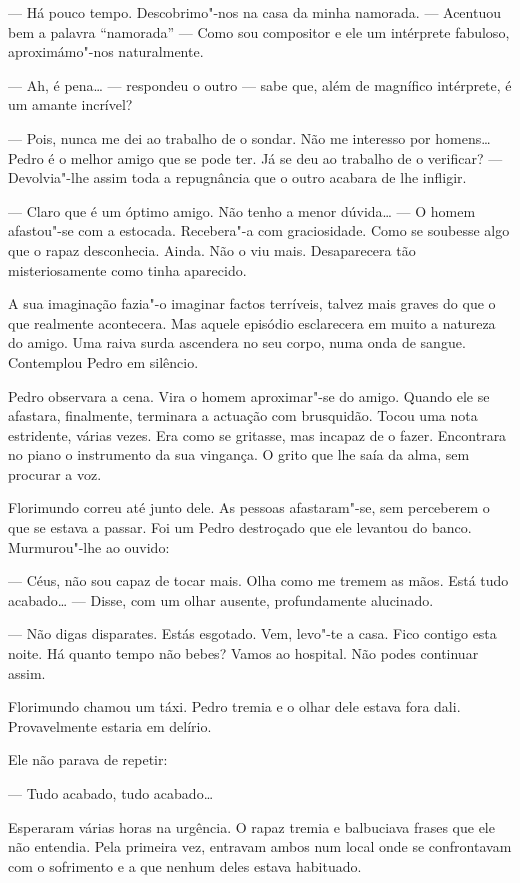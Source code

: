 --- Há pouco tempo. Descobrimo"-nos na casa da minha namorada. --- Acentuou
bem a palavra ``namorada'' --- Como sou compositor e ele um intérprete
fabuloso, aproximámo"-nos naturalmente.

--- Ah, é pena\ldots{} --- respondeu o outro --- sabe que, além de magnífico
intérprete, é um amante incrível?

--- Pois, nunca me dei ao trabalho de o sondar. Não me interesso por
homens\ldots{} Pedro é o melhor amigo que se pode ter. Já se deu ao trabalho
de o verificar? --- Devolvia"-lhe assim toda a repugnância que o outro
acabara de lhe infligir.

--- Claro que é um óptimo amigo. Não tenho a menor dúvida\ldots{} --- O homem
afastou"-se com a estocada. Recebera"-a com graciosidade. Como se soubesse
algo que o rapaz desconhecia. Ainda. Não o viu mais. Desaparecera tão
misteriosamente como tinha aparecido.

A sua imaginação fazia"-o imaginar factos terríveis, talvez mais graves
do que o que realmente acontecera. Mas aquele episódio esclarecera em
muito a natureza do amigo. Uma raiva surda ascendera no seu corpo, numa
onda de sangue. Contemplou Pedro em silêncio.

Pedro observara a cena. Vira o homem aproximar"-se do amigo. Quando ele
se afastara, finalmente, terminara a actuação com brusquidão. Tocou uma
nota estridente, várias vezes. Era como se gritasse, mas incapaz de o
fazer. Encontrara no piano o instrumento da sua vingança. O grito que
lhe saía da alma, sem procurar a voz.

Florimundo correu até junto dele. As pessoas afastaram"-se, sem
perceberem o que se estava a passar. Foi um Pedro destroçado que ele
levantou do banco. Murmurou"-lhe ao ouvido:

--- Céus, não sou capaz de tocar mais. Olha como me tremem as mãos. Está
tudo acabado\ldots{} --- Disse, com um olhar ausente, profundamente alucinado.

--- Não digas disparates. Estás esgotado. Vem, levo"-te a casa. Fico
contigo esta noite. Há quanto tempo não bebes? Vamos ao hospital. Não
podes continuar assim.

Florimundo chamou um táxi. Pedro tremia e o olhar dele estava fora dali.
Provavelmente estaria em delírio.

Ele não parava de repetir:

--- Tudo acabado, tudo acabado\ldots{}

Esperaram várias horas na urgência. O rapaz tremia e balbuciava frases
que ele não entendia. Pela primeira vez, entravam ambos num local onde
se confrontavam com o sofrimento e a que nenhum deles estava habituado.

